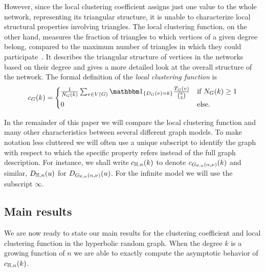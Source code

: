 However, since the local clustering coefficient assigns just one value to the whole network, representing its triangular structure, it is unable to characterize local structural properties involving triangles. The local clustering function, on the other hand, measures the fraction of triangles to which vertices of a given degree belong, compared to the maximum number of triangles in which they could participate~\cite{vazquez2002large,serrano2006clustering}. It describes the triangular structure of vertices in the networks based on their degree and gives a more detailed look at the overall structure of the network. The formal definition of the \emph{local clustering function} is 
\begin{equation}\label{eq:def_local_clustering_general}
	c_{G}(k) = \begin{cases}
		\frac{1}{N_G(k)} \sum_{v \in V(G)}  \ind{D_G(v) = k} \frac{\T_G(v)}{\binom{k}{2}} &\mbox{if } N_G(k) \ge 1\\
		0 &\mbox{else.}
	\end{cases}
\end{equation} 


\begin{remark}\label{rmk:notation}
In the remainder of this paper we will compare the local clustering function and many other characteristics between several different graph models. To make notation less cluttered we will often use a unique subscript to identify the graph with respect to which the specific property refers instead of the full graph description. For instance, we shall write $c_{\mathbb{H},n}(k)$ to denote $c_{G_{\mathbb{H},n}(\alpha, \nu)}(k)$ and similar, $D_{\mathbb{H}, n}(u)$ for $D_{G_{\mathbb{H},n}(\alpha, \nu)}(u)$. For the infinite model we will use the subscript $\infty$.
\end{remark}


\subsection{Main results}\label{ssec:main_results}

We are now ready to state our main results for the clustering coefficient and local clustering function in the hyperbolic random graph. When the degree $k$ is a growing function of $n$ we are able to exactly compute the asymptotic behavior of $c_{\mathbb{H},n}(k)$. 

